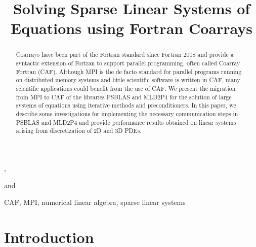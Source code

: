 \documentclass{IOS-Book-Article}
\def\hb{\hbox to 10.7 cm{}}
\begin{document}
\pagestyle{headings}
\def\thepage{}

\begin{frontmatter}              %


\title{Solving Sparse Linear Systems of Equations using Fortran Coarrays}


\author[A]{ %
},
\author[A]{ }
and
\author[B]{ }

\address[A]{University of Rome Tor Vergata, Italy}
\address[B]{Cranfield University, UK}

\begin{abstract}
Coarrays have been part of the Fortran standard since
Fortran 2008 and provide a syntactic extension of Fortran to
support parallel programming, often called Coarray Fortran (CAF). 
Although MPI is the de facto standard for parallel programs running on
distributed memory systems and little  scientific software is  written in
CAF, many scientific applications could benefit from the use of CAF.  
We present the migration from MPI to CAF of the libraries PSBLAS  and
MLD2P4 for the solution of large systems of equations using iterative
methods and preconditioners.  
In this paper, we describe some investigations for implementing the
necessary communication steps in PSBLAS and MLD2P4 and provide
performance results obtained on linear systems arising from
discretization of 2D and 3D PDEs.    
\end{abstract}

\begin{keyword}
CAF, MPI, numerical linear algebra, sparse linear systems
\end{keyword}
\end{frontmatter}



\section{Introduction}
\end{document}
